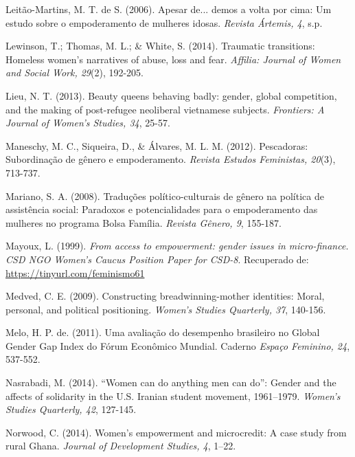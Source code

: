 \hangindent=25pt
\noindent Leitão-Martins, M. T. de S. (2006). Apesar de... demos a volta por cima: Um estudo sobre o empoderamento de mulheres idosas. \textit{Revista Ártemis, 4}, s.p.

\hangindent=25pt
\noindent Lewinson, T.; Thomas, M. L.; \& White, S. (2014). Traumatic transitions: Homeless women’s narratives of abuse, loss and fear. \textit{Affilia: Journal of Women and Social Work, 29}(2), 192-205.

\hangindent=25pt
\noindent Lieu, N. T. (2013). Beauty queens behaving badly: gender, global competition, and the making of post-refugee neoliberal vietnamese subjects. \textit{Frontiers: A Journal of Women’s Studies, 34}, 25-57.

\hangindent=25pt
\noindent Maneschy, M. C., Siqueira, D., \& Álvares, M. L. M. (2012). Pescadoras: Subordinação de gênero e empoderamento. \textit{Revista Estudos Feministas, 20}(3), 713-737.

\hangindent=25pt
\noindent Mariano, S. A. (2008). Traduções político-culturais de gênero na política de assistência social: Paradoxos e potencialidades para o empoderamento das mulheres no programa Bolsa Família. \textit{Revista Gênero, 9}, 155-187.

\hangindent=25pt
\noindent Mayoux, L. (1999). \textit{From access to empowerment: gender issues in micro-finance. CSD NGO Women’s Caucus Position Paper for CSD-8}. Recuperado de: \url{https://tinyurl.com/feminismo61}

\hangindent=25pt
\noindent Medved, C. E. (2009). Constructing breadwinning-mother identities: Moral, personal, and political positioning. \textit{Women’s Studies Quarterly, 37}, 140-156.

\hangindent=25pt
\noindent Melo, H. P. de. (2011). Uma avaliação do desempenho brasileiro no Global Gender Gap Index do Fórum Econômico Mundial. Caderno \textit{Espaço Feminino, 24}, 537-552.

\hangindent=25pt
\noindent Nasrabadi, M. (2014). ``Women can do anything men can do'': Gender and the affects of solidarity in the U.S. Iranian student movement, 1961–1979. \textit{Women’s Studies Quarterly, 42}, 127-145.

\hangindent=25pt
\noindent Norwood, C. (2014). Women's empowerment and microcredit: A case study from rural Ghana. \textit{Journal of Development Studies, 4}, 1–22.


